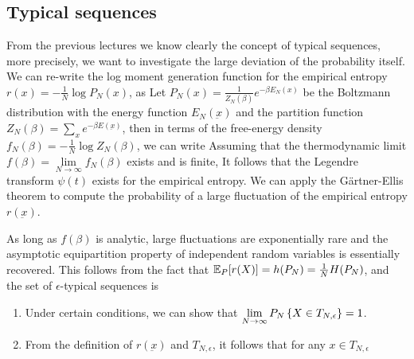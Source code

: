\documentclass[letterpaper,english,10pt]{article}
\begin{document}
\subsection{Typical sequences}
From the previous lectures we know clearly the concept of typical sequences, more precisely, we want to investigate the large deviation of the probability itself.
We can re-write the log moment generation function for the empirical entropy $r(x) = -\frac{1}{N}\log P_N(x)$, as 
Let $P_N(x) = \frac{1}{Z_N(\beta)}e^{-\beta E_N(x)}$ be the Boltzmann distribution with the energy function $E_N(\underbar x)$ and the partition function $Z_N(\beta) = \sum_{x} e^{-\beta E(\underbar x)}$, 
then in terms of the free-energy density $f_N(\beta) = -\frac{1}{N}\log Z_N(\beta)$, we can write  
Assuming that the thermodynamic limit $f(\beta) = \lim\limits_{N \to \infty}f_N(\beta)$ exists and is finite, 
It follows that the Legendre transform $\psi(t)$ exists for the empirical entropy. 
We can apply the G\"{a}rtner-Ellis theorem to compute the probability of a large fluctuation of the empirical entropy $r(\underbar x)$. 


As long as $f(\beta)$ is analytic, large fluctuations are exponentially rare and the asymptotic equipartition property of independent random variables is essentially recovered. 
This follows from the fact that $\mathbb{E}_{P}{[}r(X){]} = h(P_N) = \frac{1}{N}H(P_N)$, 
and the set of $\epsilon$-typical sequences is 
\begin{enumerate}
\item Under certain conditions, we can show that $\lim\limits_{N\to\infty}P_N\left\{X \in T_{N,\epsilon}\right\} = 1$. 
\item From the definition of $r(\underbar x)$ and $T_{N,\epsilon}$, it follows that for any $x \in T_{N,\epsilon}$
\end{enumerate}
\end{document}
